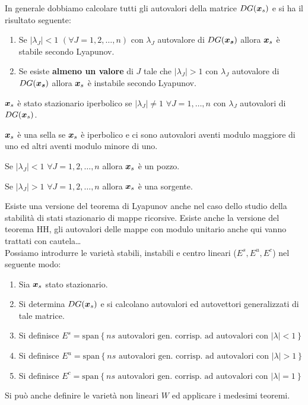 \noindent
In generale dobbiamo calcolare tutti gli autovalori della matrice $DG(\boldsymbol{x}_s)$ e si ha il risultato seguente:
\begin{enumerate}
    \item Se  $\left|\lambda_J\right| < 1$ $(\forall J = 1, 2, \ldots, n)$ con $\lambda_J$ autovalore di $DG(\boldsymbol{\boldsymbol{x}_s})$ allora $\boldsymbol{x}_s$ è stabile secondo Lyapunov.
    \item Se esiste \textbf{almeno un valore} di $J$ tale che $\left|\lambda_J\right| > 1$ con $\lambda_J$ autovalore di $DG(\boldsymbol{\boldsymbol{x}_s})$ allora $\boldsymbol{x}_s$ è instabile secondo Lyapunov.
\end{enumerate}
\begin{defn}
    $\boldsymbol{x}_s$ è stato stazionario iperbolico se $\left|\lambda_J\right|\neq 1$ $\forall J=1, \ldots, n$ con $\lambda_J$ autovalori di $DG(\boldsymbol{x}_s)$.
\end{defn}
\noindent
\begin{defn}[Sella]
    $\boldsymbol{x}_s$ è una sella se $\boldsymbol{x}_s$ è iperbolico e ci sono autovalori aventi modulo maggiore di uno ed altri aventi modulo minore di uno.
\end{defn}
\noindent
\begin{defn}[Pozzo]
    Se $\left|\lambda_J\right|<1$ $\forall J = 1, 2, \ldots, n$ allora $\boldsymbol{x}_s$ è un pozzo.
\end{defn}
\noindent
\begin{defn}[Sorgente]
    Se $\left|\lambda_J\right|>1$ $\forall J = 1, 2, \ldots, n$ allora $\boldsymbol{x}_s$ è una sorgente.
\end{defn}
\noindent
Esiste una versione del teorema di Lyapunov anche nel caso dello studio della stabilità di stati stazionario di mappe ricorsive.
Esiste anche la versione del teorema HH, gli autovalori delle mappe con modulo unitario anche qui vanno trattati con cautela\ldots \\
Possiamo introdurre le varietà stabili, instabili e centro lineari ($E^s, E^u, E^c$) nel seguente modo:
\begin{enumerate}
    \item Sia $\boldsymbol{x}_s$ stato stazionario.
    \item Si determina $DG(\boldsymbol{x}_s)$ e si calcolano autovalori ed autovettori generalizzati di tale matrice.
    \item Si definisce $E^s = \text{span}\left\{ns 
	\text{ autovalori gen. corrisp. ad autovalori con } \left|\lambda\right|<1\right\}$ 
    \item Si definisce $E^u = \text{span}\left\{ns 
	\text{ autovalori gen. corrisp. ad autovalori con } \left|\lambda\right|>1\right\}$ 
    \item Si definisce $E^c = \text{span}\left\{ns 
	\text{ autovalori gen. corrisp. ad autovalori con } \left|\lambda\right|=1\right\}$ 
\end{enumerate}
Si può anche definire le varietà non lineari $W$ ed applicare i medesimi teoremi.
